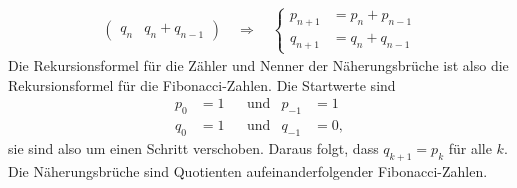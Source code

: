 \begin{beispiel}
\begin{align*}
\begin{pmatrix}
q_n&q_n+q_{n-1}
\end{pmatrix}
\quad\Rightarrow\quad
\left\{
\begin{aligned}
p_{n+1}&=p_n+p_{n-1}\\
q_{n+1}&=q_n+q_{n-1}
\end{aligned}\right.
\end{align*}
Die Rekursionsformel für die Zähler und Nenner der Näherungsbrüche ist also
die Rekursionsformel für die Fibonacci-Zahlen.
Die Startwerte sind 
\[
\begin{aligned}
p_0&=1&&\text{und}&p_{-1}&=1\\
q_0&=1&&\text{und}&q_{-1}&=0,
\end{aligned}
\]
sie sind also um einen Schritt verschoben.
Daraus folgt, dass $q_{k+1} = p_k$ für alle $k$.
Die Näherungsbrüche sind Quotienten aufeinanderfolgender Fibonacci-Zahlen.
\end{beispiel}

